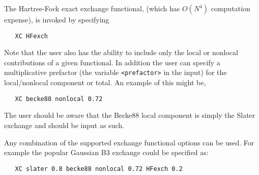 The Hartree-Fock exact exchange functional, (which has $O(N^4)$
computation expense), is invoked by specifying
\begin{verbatim}
   XC HFexch
\end{verbatim}

Note that the user also has the ability to include only the local or
nonlocal contributions of a given functional.  In addition the user
can specify a multiplicative prefactor (the variable
\verb+<prefactor>+ in the input) for the local/nonlocal component or
total.  An example of this might be,
\begin{verbatim}
   XC becke88 nonlocal 0.72
\end{verbatim}
The user should be aware that the Becke88 local component is simply
the Slater exchange and should be input as such.

Any combination of the supported exchange functional options can be
used.  For example the popular Gaussian B3 exchange could be specified
as:
\begin{verbatim}
   XC slater 0.8 becke88 nonlocal 0.72 HFexch 0.2
\end{verbatim}

  



\sloppy

